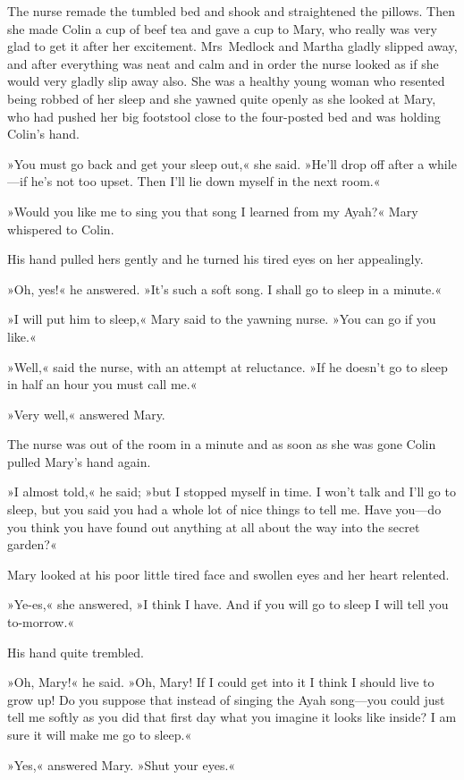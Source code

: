 The nurse remade the tumbled bed and shook and straightened the pillows. Then she made Colin a cup of beef tea and gave a cup to Mary, who really was very glad to get it after her excitement. Mrs~Medlock and Martha gladly slipped away, and after everything was neat and calm and in order the nurse looked as if she would very gladly slip away also. She was a healthy young woman who resented being robbed of her sleep and she yawned quite openly as she looked at Mary, who had pushed her big footstool close to the four-posted bed and was holding Colin's hand.

»You must go back and get your sleep out,« she said. »He'll drop off after a while—if he's not too upset. Then I'll lie down myself in the next room.«

»Would you like me to sing you that song I learned from my Ayah?« Mary whispered to Colin.

His hand pulled hers gently and he turned his tired eyes on her appealingly.

»Oh, yes!« he answered. »It's such a soft song. I shall go to sleep in a minute.«

»I will put him to sleep,« Mary said to the yawning nurse. »You can go if you like.«

»Well,« said the nurse, with an attempt at reluctance. »If he doesn't go to sleep in half an hour you must call me.«

»Very well,« answered Mary.

The nurse was out of the room in a minute and as soon as she was gone Colin pulled Mary's hand again.

»I almost told,« he said; »but I stopped myself in time. I won't talk and I'll go to sleep, but you said you had a whole lot of nice things to tell me. Have you—do you think you have found out anything at all about the way into the secret garden?«

Mary looked at his poor little tired face and swollen eyes and her heart relented.

»Ye-es,« she answered, »I think I have. And if you will go to sleep I will tell you to-morrow.«

His hand quite trembled.

»Oh, Mary!« he said. »Oh, Mary! If I could get into it I think I should live to grow up! Do you suppose that instead of singing the Ayah song—you could just tell me softly as you did that first day what you imagine it looks like inside? I am sure it will make me go to sleep.«

»Yes,« answered Mary. »Shut your eyes.«

